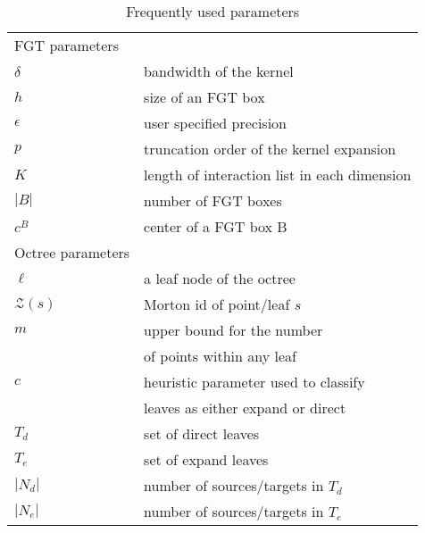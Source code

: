  
\begin{table}[ht!]
\small
\caption{\label{t:notation} Frequently used parameters}
\begin{tabular}{|ll|}
\hline 
FGT parameters &\\
$\delta$                    & bandwidth of the kernel\\
$h$                         & size of an FGT box \\
$\epsilon$                  & user specified precision\\
$p$                         & truncation order of the kernel expansion \\
$K$                         & length of interaction list in each dimension \\
$|B|$                       & number of FGT boxes \\
$c^B$                       & center of a FGT box B \\
\hline 
Octree parameters &\\
$\ell$                       & a leaf node of the octree \\
$\mathcal{Z}(s)$            & Morton id of point/leaf $s$ \\
$m$                         & upper bound for the number \\ 
                            & of points within any leaf \\
$c$                          & heuristic parameter used to classify \\
                            & leaves as either expand or direct \\
$T_d$                       & set of direct leaves \\
$T_e$                       & set of expand leaves \\ 
$|N_d|$                     & number of sources/targets in $T_d$ \\ 
$|N_e|$                     & number of sources/targets in $T_e$ \\ 
\hline
\end{tabular}
\end{table}

